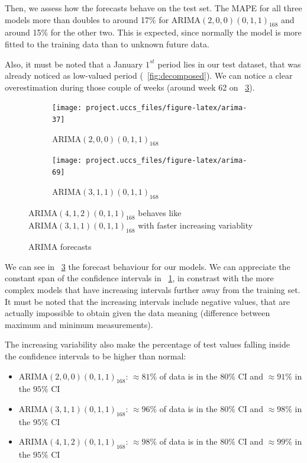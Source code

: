 \documentclass[12pt]{article}
\begin{document}
Then, we assess how the forecasts behave on the test set. The MAPE for all three models more than doubles to around 17\% for $\mathrm{ARIMA}(2,0,0)(0,1,1)_{168}$ and around 15\% for the other two. This is expected, since normally the model is more fitted to the training data than to unknown future data.

Also, it must be noted that a January $1^{st}$ period lies in our test dataset, that was already noticed as low-valued period (\figurename~\ref{fig:decomposed}). We can notice a clear overestimation during those couple of weeks (around week 62 on \figurename~\ref{fig:arima-forecast}).

\begin{figure}[h]
	\begin{subfigure}{.5\linewidth}
		\texttt{[image: project.uccs\_files/figure-latex/arima-37]}
		\caption{$\mathrm{ARIMA}(2,0,0)(0,1,1)_{168}$}
		\label{fig:arima-forecast:200011}
	\end{subfigure}
	\begin{subfigure}{.5\linewidth}
		\texttt{[image: project.uccs\_files/figure-latex/arima-69]}
		\caption{$\mathrm{ARIMA}(3,1,1)(0,1,1)_{168}$}
		\label{fig:arima-forecast:412011}
	\end{subfigure}
	\caption{ARIMA forecasts}{\centering\footnotesize$\mathrm{ARIMA}(4,1,2)(0,1,1)_{168}$ behaves like $\mathrm{ARIMA}(3,1,1)(0,1,1)_{168}$ with faster increasing variablity\\}
	\label{fig:arima-forecast}
\end{figure}
%
We can see in \figurename~\ref{fig:arima-forecast} the forecast behaviour for our models. We can appreciate the constant span of the confidence intervals in \figurename~\ref{fig:arima-forecast:200011}, in constrast with the more complex models that have increasing intervals further away from the training set. It must be noted that the increasing intervals include negative values, that are actually impossible to obtain given the data meaning (difference between maximum and minimum measurements).

The increasing variability also make the percentage of test values falling inside the confidence intervals to be higher than normal:
\begin{itemize}[topsep=0.5em,itemsep=0em,partopsep=0.5em]
	\item $\mathrm{ARIMA}(2,0,0)(0,1,1)_{168}$: $\approx81\%$ of data is in the $80\%$ CI and $\approx91\%$ in the $95\%$ CI
	\item $\mathrm{ARIMA}(3,1,1)(0,1,1)_{168}$: $\approx96\%$ of data is in the $80\%$ CI and $\approx98\%$ in the $95\%$ CI
	\item $\mathrm{ARIMA}(4,1,2)(0,1,1)_{168}$: $\approx98\%$ of data is in the $80\%$ CI and $\approx99\%$ in the $95\%$ CI
\end{itemize}
\end{document}
